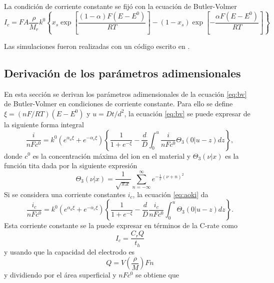 La condición de corriente constante se fijó con la ecuación de Butler-Volmer
\begin{equation}\label{eq:bv}
    I_c = F A \frac{\rho}{M_r} k^0 \left\{x_s \exp\left[ \frac{(1-\alpha)F(E-E^0)}{RT} \right] - (1 - x_s) \exp\left[ -\frac{\alpha F (E-E^0)}{RT} \right] \right\}
\end{equation}

Las simulaciones fueron realizadas con un código escrito en .


\subsection{Derivación de los parámetros adimensionales}\label{s:derivparam}

En esta sección se derivan los parámetros adimensionales de la ecuación
\ref{eq:bv} de Butler-Volmer en condiciones de corriente constante. Para ello se 
define $\xi = (nF/RT)(E - E^0)$ y $u = D t / d^2$, la ecuación \ref{eq:bv} se 
puede expresar de la siguiente forma integral \cite{aoki1984}
\begin{equation}\label{eq:aoki}
    \frac{i}{n F c^0} = k^0 \left(e^{\alpha_a \xi} + e^{-\alpha_c \xi}\right) \left\{ \frac{1}{1+e^{-\xi}} - \frac{d}{D} \int_0^u \frac{i}{n F c^0} \Theta_3(0|u - z) dz \right\},
\end{equation}
donde $c^0$ es la concentración máxima del ion en el material y $\Theta_3(\nu|x)$ 
es la función tita \cite{bieniasz2015} dada por la siguiente expresión
\begin{equation}
    \Theta_3(\nu|x) = \frac{1}{\sqrt{\pi x}} \sum_{n=-\infty}^{\infty} e^{-\frac{1}{x}(\nu + n)^2}
\end{equation}
Si se considera una corriente constantes $i_c$, la ecuación \ref{eq:aoki} da
\begin{equation}\label{eq:aoki2}
    \frac{i_c}{n F c^0} = k^0 \left(e^{\alpha_a \xi} + e^{-\alpha_c \xi}\right) \left\{ \frac{1}{1+e^{-\xi}} - \frac{d}{D} \frac{i_c}{n F c^0} \int_0^u \Theta_3(0|u - z) dz \right\}.
\end{equation}
Esta corriente constante se la puede expresar en términos de la C-rate como
\begin{equation}
    I_c = \frac{C_r Q}{t_h}
\end{equation}
y usando que la capacidad del electrodo es
\begin{equation}
    Q = V \left( \frac{\rho}{M} \right) F n
\end{equation}
y dividiendo por el área superficial y $n F c^0$ se obtiene que

